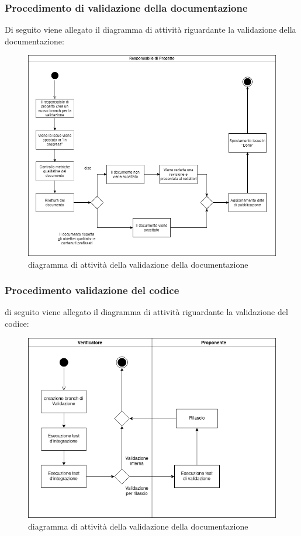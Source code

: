 	\subsubsection{Procedimento di validazione della documentazione}
		Di seguito viene allegato il diagramma di attività riguardante la validazione della documentazione:
		\begin{figure}[hbt!]
	       \centering \includegraphics[width=1.0\textwidth]{source/images/Validazione.png}
	        \caption{diagramma di attività della validazione della documentazione}
	    \end{figure}
	   
	\subsubsection{Procedimento validazione del codice}
	    di seguito viene allegato il diagramma di attività riguardante la validazione del codice:
	    \begin{figure}[hbt!]
	       \centering \includegraphics[width=1.0\textwidth]{source/images/validazioneCodice.png}
	        \caption{diagramma di attività della validazione della documentazione}
	    \end{figure}
